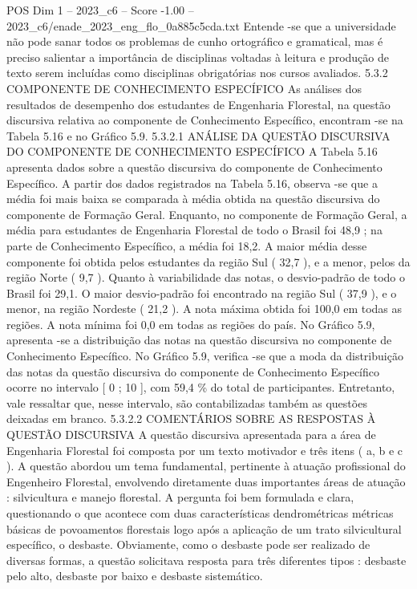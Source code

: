 \begin{textsample}{POS Dim 1 – 2023\_c6 – Score -1.00 – 2023\_c6/enade\_2023\_eng\_flo\_0a885c5cda.txt}
Entende -se que a universidade não pode sanar todos os problemas de cunho ortográfico e gramatical, mas é preciso salientar a importância de disciplinas voltadas à leitura e produção de texto serem incluídas como disciplinas obrigatórias nos cursos avaliados. 5.3.2 COMPONENTE DE CONHECIMENTO ESPECÍFICO As análises dos resultados de desempenho dos estudantes de Engenharia Florestal, na questão discursiva relativa ao componente de Conhecimento Específico, encontram -se na Tabela 5.16 e no Gráfico 5.9. 5.3.2.1 ANÁLISE DA QUESTÃO DISCURSIVA DO COMPONENTE DE CONHECIMENTO ESPECÍFICO A Tabela 5.16 apresenta dados sobre a questão discursiva do componente de Conhecimento Específico.
A partir dos dados registrados na Tabela 5.16, observa -se que a média foi mais baixa se comparada à média obtida na questão discursiva do componente de Formação Geral.
Enquanto, no componente de Formação Geral, a média para estudantes de Engenharia Florestal de todo o Brasil foi 48,9 ; na parte de Conhecimento Específico, a média foi 18,2.
A maior média desse componente foi obtida pelos estudantes da região Sul ( 32,7 ), e a menor, pelos da região Norte ( 9,7 ).
Quanto à variabilidade das notas, o desvio-padrão de todo o Brasil foi 29,1.
O maior desvio-padrão foi encontrado na região Sul ( 37,9 ), e o menor, na região Nordeste ( 21,2 ).
A nota máxima obtida foi 100,0 em todas as regiões.
A nota mínima foi 0,0 em todas as regiões do país.
No Gráfico 5.9, apresenta -se a distribuição das notas na questão discursiva no componente de Conhecimento Específico.
No Gráfico 5.9, verifica -se que a moda da distribuição das notas da questão discursiva do componente de Conhecimento Específico ocorre no intervalo [ 0 ; 10 ], com 59,4 \% do total de participantes.
Entretanto, vale ressaltar que, nesse intervalo, são contabilizadas também as questões deixadas em branco. 5.3.2.2 COMENTÁRIOS SOBRE AS RESPOSTAS À QUESTÃO DISCURSIVA A questão discursiva apresentada para a área de Engenharia Florestal foi composta por um texto motivador e três itens ( a, b e c ).
A questão abordou um tema fundamental, pertinente à atuação profissional do Engenheiro Florestal, envolvendo diretamente duas importantes áreas de atuação : silvicultura e manejo florestal.
A pergunta foi bem formulada e clara, questionando o que acontece com duas características dendrométricas métricas básicas de povoamentos florestais logo após a aplicação de um trato silvicultural específico, o desbaste.
Obviamente, como o desbaste pode ser realizado de diversas formas, a questão solicitava resposta para três diferentes tipos : desbaste pelo alto, desbaste por baixo e desbaste sistemático.

\end{textsample}
